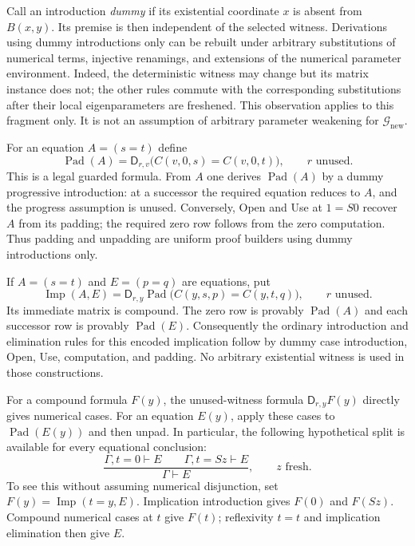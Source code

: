 Call an introduction \emph{dummy} if its existential coordinate $x$
is absent from $B(x,y)$.  Its premise is then independent of the
selected witness.  Derivations using dummy introductions only can be
rebuilt under arbitrary substitutions of numerical terms, injective
renamings, and extensions of the numerical parameter environment.
Indeed, the deterministic witness may change but its matrix instance
does not; the other rules commute with the corresponding substitutions
after their local eigenparameters are freshened.  This observation
applies to this fragment only.  It is not an assumption of arbitrary
parameter weakening for $\mathcal G_{\mathrm{new}}$.

For an equation $A=(s=t)$ define
\[
 \operatorname{Pad}(A)=
 \mathsf D_{r,v}\bigl(C(v,0,s)=C(v,0,t)\bigr),
 \qquad r\text{ unused}.
\]
This is a legal guarded formula.  From $A$ one derives
$\operatorname{Pad}(A)$ by a dummy progressive introduction: at a
successor the required equation reduces to $A$, and the progress
assumption is unused.  Conversely, Open and Use at $1=S0$ recover
$A$ from its padding; the required zero row follows from the zero
computation.  Thus padding and unpadding are uniform proof builders
using dummy introductions only.

If $A=(s=t)$ and $E=(p=q)$ are equations, put
\[
 \operatorname{Imp}(A,E)=
 \mathsf D_{r,y}\operatorname{Pad}
   \bigl(C(y,s,p)=C(y,t,q)\bigr),
 \qquad r\text{ unused}.
\]
Its immediate matrix is compound.  The zero row is provably
$\operatorname{Pad}(A)$ and each successor row is provably
$\operatorname{Pad}(E)$.  Consequently the ordinary introduction
and elimination rules for this encoded implication follow by dummy
case introduction, Open, Use, computation, and padding.  No arbitrary
existential witness is used in those constructions.

For a compound formula $F(y)$, the unused-witness formula
$\mathsf D_{r,y}F(y)$ directly gives numerical cases.  For an equation
$E(y)$, apply these cases to $\operatorname{Pad}(E(y))$ and then
unpad.  In particular, the following hypothetical split is available
for every equational conclusion:
\[
 \frac{\Gamma,t=0\vdash E\qquad
       \Gamma,t=Sz\vdash E}
      {\Gamma\vdash E},
 \qquad z\text{ fresh}.
 \tag{HC}\label{eq:guarded-hyp-cases}
\]
To see this without assuming numerical disjunction, set
$F(y)=\operatorname{Imp}(t=y,E)$.  Implication introduction gives
$F(0)$ and $F(Sz)$.  Compound numerical cases at $t$ give $F(t)$;
reflexivity $t=t$ and implication elimination then give $E$.

